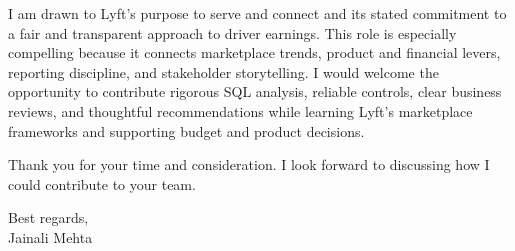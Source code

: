 \documentclass[letterpaper,11pt]{article}
\begin{document}
\bigbreak
I am drawn to Lyft's purpose to serve and connect and its stated commitment to a fair and transparent approach to driver earnings. This role is especially compelling because it connects marketplace trends, product and financial levers, reporting discipline, and stakeholder storytelling. I would welcome the opportunity to contribute rigorous SQL analysis, reliable controls, clear business reviews, and thoughtful recommendations while learning Lyft's marketplace frameworks and supporting budget and product decisions.

\bigbreak
Thank you for your time and consideration. I look forward to discussing how I could contribute to your team.

\bigbreak
Best regards,\\
Jainali Mehta
\end{document}
